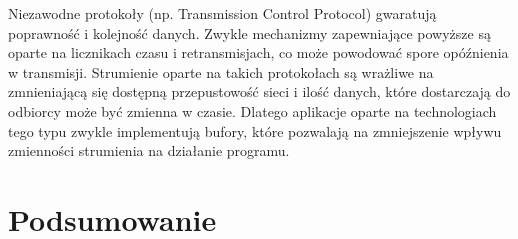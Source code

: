 Niezawodne protokoły (np. Transmission Control Protocol) gwaratują poprawność i kolejność danych. Zwykle mechanizmy zapewniające powyższe są oparte na licznikach czasu i retransmisjach, co może powodować spore opóźnienia w transmisji. Strumienie oparte na takich protokołach są wrażliwe na zmnieniającą się dostępną przepustowość sieci i ilość danych, które dostarczają do odbiorcy może być zmienna w czasie. Dlatego aplikacje oparte na technologiach tego typu zwykle implementują bufory, które pozwalają na zmniejszenie wpływu zmienności strumienia na działanie programu.



\section{Podsumowanie}
